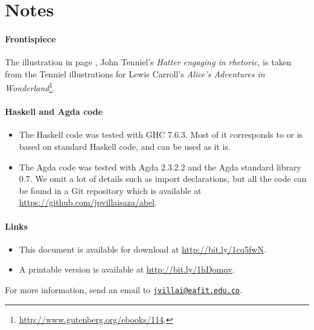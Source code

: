 \section{Notes}
\label{sec:introduction-notes}

\paragraph{Frontispiece}

The illustration in page \pageref{fig:hatter}, John Tenniel's
\emph{Hatter engaging in rhetoric}, is taken from the Tenniel
illustrations for Lewis Carroll's \emph{Alice's Adventures in
  Wonderland}\footnote{\url{http://www.gutenberg.org/ebooks/114}.}.

\paragraph{Haskell and Agda code}

\begin{itemize}
\item
  The Haskell code was tested with GHC 7.6.3. Most of it corresponds
  to or is based on standard Haskell code, and can be used as it is.

\item
  The Agda code was tested with Agda 2.3.2.2 and the Agda standard
  library 0.7. We omit a lot of details such as import declarations,
  but all the code can be found in a Git repository which is available
  at \url{https://github.com/jpvillaisaza/abel}.

\end{itemize}

\paragraph{Links}

\begin{itemize}
\item
  This document is available for download at
  \url{http://bit.ly/1cq5fwN}.

\item
  A printable version is available at \url{http://bit.ly/1hDomqv}.

\end{itemize}
For more information, send an email to
\href{mailto:jvillai@eafit.edu.co}{\nolinkurl{jvillai@eafit.edu.co}}.

\clearemptydoublepage
